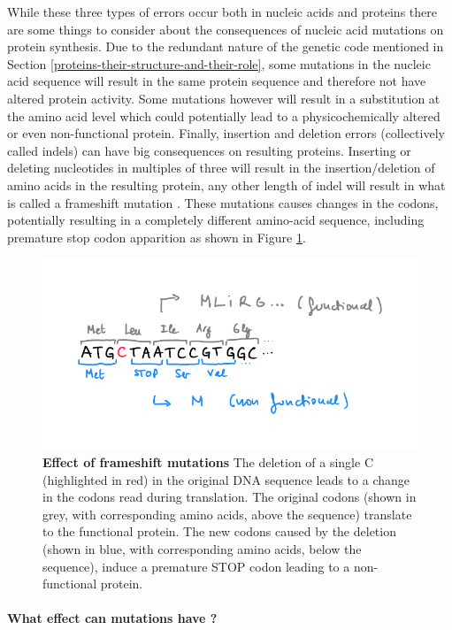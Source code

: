 \documentclass[
  11pt,
  twoside]{scrbook}
\newcommand{\extcaption}[2]{
    \caption[#1]{
        \textbf{#1}\newline
        #2
    }
}
\begin{document}
While these three types of errors occur both in nucleic acids and proteins there are some things to consider about the consequences of nucleic acid mutations on protein synthesis. Due to the redundant nature of the genetic code mentioned in Section \ref{proteins-their-structure-and-their-role}, some mutations in the nucleic acid sequence will result in the same protein sequence and therefore not have altered protein activity. Some mutations however will result in a substitution at the amino acid level which could potentially lead to a physicochemically altered or even non-functional protein. Finally, insertion and deletion errors (collectively called indels) can have big consequences on resulting proteins. Inserting or deleting nucleotides in multiples of three will result in the insertion/deletion of amino acids in the resulting protein, any other length of indel will result in what is called a frameshift mutation \autocite{rothFrameshiftMutations1974}. These mutations causes changes in the codons, potentially resulting in a completely different amino-acid sequence, including premature stop codon apparition as shown in Figure \ref{fig:frameshift}.

\begin{figure}[h]
\centering
\includegraphics[width=0.6\linewidth]{./figures/Sequence-Intro/Frameshift.pdf}
\extcaption{Effect of frameshift mutations}{The deletion of a single C (highlighted in red) in the original DNA sequence leads to a change in the codons read during translation. The original codons (shown in grey, with corresponding amino acids, above the sequence) translate to the functional protein. The new codons caused by the deletion (shown in blue, with corresponding amino acids, below the sequence), induce a premature STOP codon leading to a non-functional protein. }
\label{fig:frameshift}
\end{figure}

\hypertarget{what-effect-can-mutations-have}{%
\paragraph{What effect can mutations have ?}\label{what-effect-can-mutations-have}}
\end{document}
